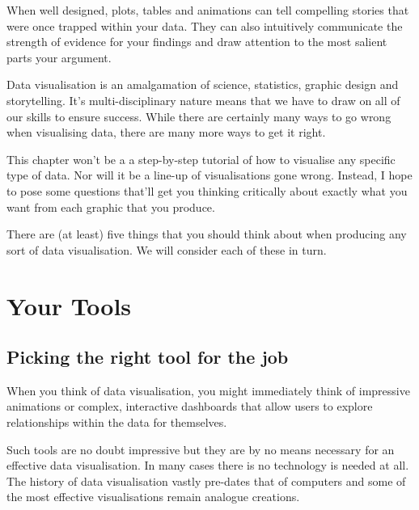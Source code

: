 \documentclass[
  letterpaper,
  DIV=11,
  numbers=noendperiod]{scrreprt}
\begin{document}
When well designed, plots, tables and animations can tell compelling
stories that were once trapped within your data. They can also
intuitively communicate the strength of evidence for your findings and
draw attention to the most salient parts your argument.

Data visualisation is an amalgamation of science, statistics, graphic
design and storytelling. It's multi-disciplinary nature means that we
have to draw on all of our skills to ensure success. While there are
certainly many ways to go wrong when visualising data, there are many
more ways to get it right.

This chapter won't be a a step-by-step tutorial of how to visualise any
specific type of data. Nor will it be a line-up of visualisations gone
wrong. Instead, I hope to pose some questions that'll get you thinking
critically about exactly what you want from each graphic that you
produce.

There are (at least) five things that you should think about when
producing any sort of data visualisation. We will consider each of these
in turn.

\section{Your Tools 🔨}\label{your-tools}

\subsection{Picking the right tool for the
job}\label{picking-the-right-tool-for-the-job}

When you think of data visualisation, you might immediately think of
impressive animations or complex, interactive dashboards that allow
users to explore relationships within the data for themselves.

Such tools are no doubt impressive but they are by no means necessary
for an effective data visualisation. In many cases there is no
technology is needed at all. The history of data visualisation vastly
pre-dates that of computers and some of the most effective
visualisations remain analogue creations.
\end{document}
